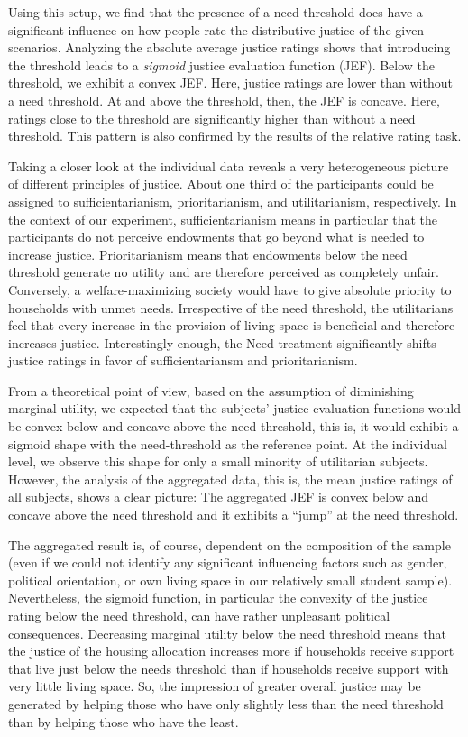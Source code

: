 \documentclass[12pt]{scrartcl}
\begin{document}
Using this setup, we find that the presence of a need threshold does have a significant influence on how people rate the distributive justice of the given scenarios.
Analyzing the absolute average justice ratings shows that introducing the threshold leads to a \textit{sigmoid} justice evaluation function (JEF).
Below the threshold, we exhibit a convex JEF.
Here, justice ratings are lower than without a need threshold.
At and above the threshold, then, the JEF is concave.
Here, ratings close to the threshold are significantly higher than without a need threshold.
This pattern is also confirmed by the results of the relative rating task.

Taking a closer look at the individual data reveals a very heterogeneous picture of different principles of justice.
About one third of the participants could be assigned to sufficientarianism, prioritarianism, and utilitarianism, respectively.
In the context of our experiment, sufficientarianism means in particular that the participants do not perceive endowments that go beyond what is needed to increase justice.
Prioritarianism means that endowments below the need threshold generate no utility and are therefore perceived as completely unfair.
Conversely, a welfare-maximizing society would have to give absolute priority to households with unmet needs.
Irrespective of the need threshold, the utilitarians feel that every increase in the provision of living space is beneficial and therefore increases justice.
Interestingly enough, the Need treatment significantly shifts justice ratings in favor of sufficientariansm and prioritarianism.

From a theoretical point of view, based on the assumption of diminishing marginal utility, we expected that the subjects' justice evaluation functions would be convex below and concave above the need threshold, this is, it would exhibit a sigmoid shape with the need-threshold as the reference point.
At the individual level, we observe this shape for only a small minority of utilitarian subjects.
However, the analysis of the aggregated data, this is, the mean justice ratings of all subjects, shows a clear picture: The aggregated JEF is convex below and concave above the need threshold and it exhibits a ``jump'' at the need threshold.

The aggregated result is, of course, dependent on the composition of the sample (even if we could not identify any significant influencing factors such as gender, political orientation, or own living space in our relatively small student sample).
Nevertheless, the sigmoid function, in particular the convexity of the justice rating below the need threshold, can have rather unpleasant political consequences.
Decreasing marginal utility below the need threshold means that the justice of the housing allocation increases more if households receive support that live just below the needs threshold than if households receive support with very little living space.
So, the impression of greater overall justice may be generated by helping those who have only slightly less than the need threshold than by helping those who have the least.
\end{document}
